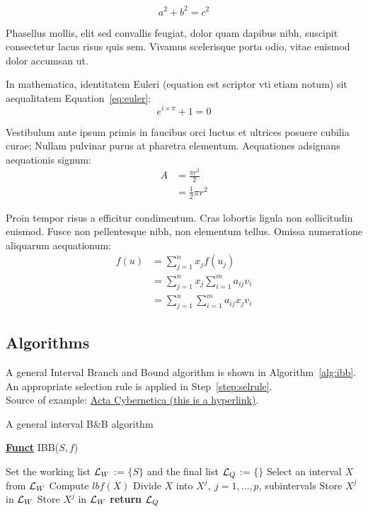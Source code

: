 $$a^2 + b^2 = c^2$$

Phasellus mollis, elit sed convallis feugiat, dolor quam dapibus nibh, suscipit consectetur lacus risus quis sem. Vivamus scelerisque porta odio, vitae euismod dolor accumsan ut.

In mathematica, identitatem Euleri (equation est scriptor vti etiam notum) sit aequalitatem Equation~\ref{eq:euler}:
\begin{equation}\label{eq:euler}
e^{i \times \pi} + 1 = 0
\end{equation}

Vestibulum ante ipsum primis in faucibus orci luctus et ultrices posuere cubilia curae; Nullam pulvinar purus at pharetra elementum.
Aequationes adsignans aequationis signum:
\begin{align}
	A & = \frac{\pi r^2}{2} \\
	& = \frac{1}{2} \pi r^2
\end{align}

Proin tempor risus a efficitur condimentum. Cras lobortis ligula non sollicitudin euismod. Fusce non pellentesque nibh, non elementum tellus.
Omissa numeratione aliquarum aequationum:
\begin{align}
	f(u) & =\sum_{j=1}^{n} x_jf(u_j) \nonumber \\
	& =\sum_{j=1}^{n} x_j \sum_{i=1}^{m} a_{ij}v_i \nonumber \\
	& =\sum_{j=1}^{n} \sum_{i=1}^{m} a_{ij}x_jv_i
\end{align}

\subsection{Algorithms}

A general Interval Branch and Bound algorithm is shown in Algorithm~\ref{alg:ibb}. An appropriate selection rule is applied in Step~\ref{step:selrule}.\\
Source of example: \href{https://www.inf.u-szeged.hu/actacybernetica/}{Acta Cybernetica (this is a hyperlink)}.

\begin{algorithm}[H]
\caption{A general interval B\&B algorithm} 
\label{alg:ibb} 
\textbf{\underline{Funct}} IBB($S,f$)
\begin{algorithmic}[1] %
\State Set the working list ${\cal L}_W$ := $\{S\}$ and the final list ${\cal L}_Q$ := $\{\}$     
 \label{alg:igoend}
	\State  Select an interval $X$ from ${\cal L}_W$ \label{step:selrule}  
	\State Compute $lbf(X)$ 		  
	 
		\State Divide $X$ into $X^j,\ j=1,\dots, p$, subintervals   
			 
				\State Store $X^j$ in ${\cal L}_W$ 
			\Else
				\State Store $X^j$ in ${\cal L}_W$ 
			\EndIf
		\EndFor  
	\EndIf
\EndWhile
\State \textbf{return} ${\cal L}_Q$
\end{algorithmic}
\end{algorithm}
